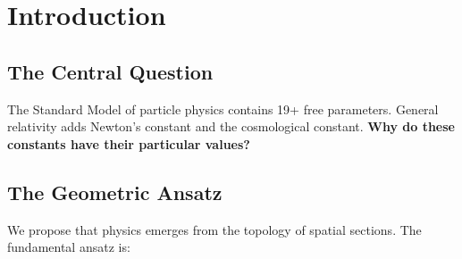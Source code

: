 \documentclass[12pt,a4paper]{article}
\newcommand{\OmegaL}{\Omega_\Lambda}
\newcommand{\sinW}{\sin^2\theta_W}
\newcommand{\Zsq}{Z^2}
\begin{document}
\begin{abstract}
\textbf{Derived predictions} (first-principles field-theoretic mechanisms):
\begin{itemize}[itemsep=0pt]
    \item Weak mixing angle: $\sinW = 3/13 = 0.2308$ via D-brane cycle volumes (0.17\% error)
    \item Cosmological densities: $\OmegaL = 13/19 = 0.684$ via holographic DoF equipartition (0.1\% error)
    \item Tensor-to-scalar ratio: $r = 1/(2\Zsq) = 0.015$ via topological suppression
    \item Spectral index: $n_s = 1 - 2/N \approx 0.967$ from e-folding constraint
\end{itemize}

\textbf{Holographic conjecture} (index-theoretic structure with open RG mechanism):
\begin{itemize}[itemsep=0pt]
    \item Fine structure constant: $\alpha^{-1} = 4\Zsq + 3 = 137.04$ via holographic IR fixed point (0.004\% error)
\end{itemize}

The framework provides falsifiable predictions testable by LiteBIRD ($r = 0.015$) and tabletop experiments.
\end{abstract}

\tableofcontents
\newpage

\section{Introduction}
\label{sec:intro}

\subsection{The Central Question}

The Standard Model of particle physics contains 19+ free parameters. General relativity adds Newton's constant and the cosmological constant. \textbf{Why do these constants have their particular values?}

\subsection{The Geometric Ansatz}

We propose that physics emerges from the topology of spatial sections. The fundamental ansatz is:
\end{document}
